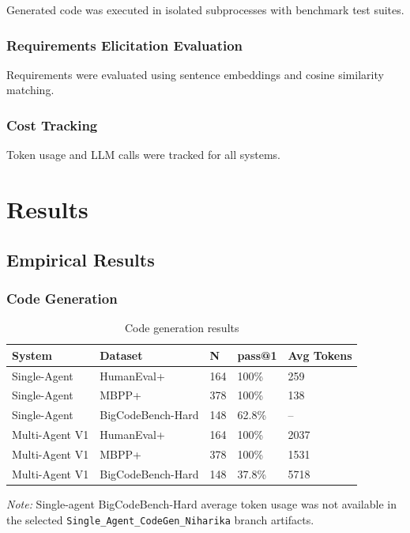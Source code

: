 \documentclass[11pt]{article}
\begin{document}
Generated code was executed in isolated subprocesses with benchmark test suites.

\subsubsection*{Requirements Elicitation Evaluation}

Requirements were evaluated using sentence embeddings and cosine similarity matching.

\subsubsection*{Cost Tracking}

Token usage and LLM calls were tracked for all systems.

\section{Results}

\subsection{Empirical Results}

\subsubsection{Code Generation}

\begin{table}[h]
\centering
\begin{tabular}{lllll}
\toprule
System & Dataset & N & pass@1 & Avg Tokens \\
\midrule
Single-Agent & HumanEval+ & 164 & 100\% & 259 \\
Single-Agent & MBPP+ & 378 & 100\% & 138 \\
Single-Agent & BigCodeBench-Hard & 148 & 62.8\% & -- \\
Multi-Agent V1 & HumanEval+ & 164 & 100\% & 2037 \\
Multi-Agent V1 & MBPP+ & 378 & 100\% & 1531 \\
Multi-Agent V1 & BigCodeBench-Hard & 148 & 37.8\% & 5718 \\
\bottomrule
\end{tabular}
\caption{Code generation results}
\end{table}
\noindent\textit{Note:} Single-agent BigCodeBench-Hard average token usage was not available in the selected \verb|Single_Agent_CodeGen_Niharika| branch artifacts.
\end{document}
